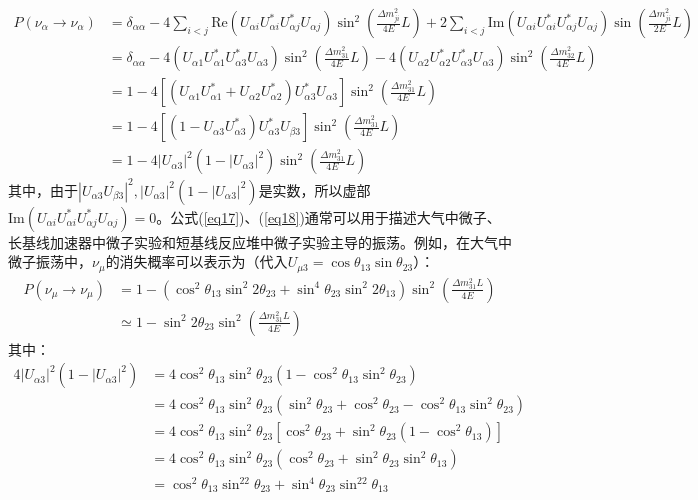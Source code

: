 \documentclass{article}
\begin{document}
		\begin{equation*}
			\begin{aligned}
				P(\nu_\alpha\to\nu_\alpha)&=\delta_{\alpha\alpha}-4\sum_{i<j}\mathrm{Re}(U_{\alpha i}U_{\alpha i}^\ast U_{\alpha j}^\ast U_{\alpha j})\sin^2\left(\frac{\Delta m_{ji}^2}{4E}L\right)+2\sum_{i<j}\mathrm{Im}(U_{\alpha i}U_{\alpha i}^\ast U_{\alpha j}^\ast U_{\alpha j})\sin\left(\frac{\Delta m_{ji}^2}{2E}L\right)\\
				&=\delta_{\alpha\alpha}-4(U_{\alpha 1}U_{\alpha 1}^\ast U_{\alpha 3}^\ast U_{\alpha 3})\sin^2\left(\frac{\Delta m_{31}^2}{4E}L\right)-4(U_{\alpha 2}U_{\alpha 2}^\ast U_{\alpha 3}^\ast U_{\alpha 3})\sin^2\left(\frac{\Delta m_{32}^2}{4E}L\right)\\
				&=1-4[(U_{\alpha1}U_{\alpha1}^\ast+U_{\alpha2}U_{\alpha2}^\ast)U_{\alpha3}^\ast U_{\alpha3}]\sin^2\left(\frac{\Delta m_{31}^2}{4E}L\right)\\
				&=1-4[(1-U_{\alpha3}U_{\alpha3}^\ast)U_{\alpha3}^\ast U_{\beta3}]\sin^2\left(\frac{\Delta m_{31}^2}{4E}L\right)\\
				&=1-4|U_{\alpha3}|^2(1-|U_{\alpha3}|^2)\sin^2\left(\frac{\Delta m_{31}^2}{4E}L\right)
			\end{aligned}
		\end{equation*}
		其中，由于$|U_{\alpha3}U_{\beta3}|^2,|U_{\alpha3}|^2(1-|U_{\alpha3}|^2)$是实数，所以虚部$\mathrm{Im}(U_{\alpha i}U_{\alpha i}^\ast U_{\alpha j}^\ast U_{\alpha j})=0$。公式(\ref{eq17})、(\ref{eq18})通常可以用于描述大气中微子、长基线加速器中微子实验和短基线反应堆中微子实验主导的振荡。例如，在大气中微子振荡中，$\nu_\mu$的消失概率可以表示为（代入$U_{\mu3}=\cos\theta_{13}\sin\theta_{23}$）：
		\begin{align}
			P(\nu_{\mu}\rightarrow\nu_{\mu}) 
				&= 1 - \left( \cos^{2}\theta_{13} \sin^{2}2\theta_{23} + \sin^{4}\theta_{23} \sin^{2}2\theta_{13} \right) 
   					 \sin^{2}\left(\frac{\Delta m_{31}^{2}L}{4E}\right) \label{eq19} \\
				&\simeq 1 - \sin^2 2\theta_{23} \sin^2\left(\frac{\Delta m_{31}^2L}{4E}\right) \label{eq20}
		\end{align}
		其中：
		\begin{equation*}
			\begin{aligned}
				4|U_{\alpha3}|^2(1-|U_{\alpha3}|^2)&=4\cos^2\theta_{13}\sin^2\theta_{23}(1-\cos^2\theta_{13}\sin^2\theta_{23})\\
				&=4\cos^2\theta_{13}\sin^2\theta_{23}(\sin^2\theta_{23}+\cos^2\theta_{23}-\cos^2\theta_{13}\sin^2\theta_{23})\\
				&=4\cos^2\theta_{13}\sin^2\theta_{23}[\cos^2\theta_{23}+\sin^2\theta_{23}(1-\cos^2\theta_{13})]\\
				&=4\cos^2\theta_{13}\sin^2\theta_{23}(\cos^2\theta_{23}+\sin^2\theta_{23}\sin^2\theta_{13})\\
				&=\cos^2\theta_{13}\sin^22\theta_{23}+\sin^4\theta_{23}\sin^22\theta_{13}
			\end{aligned}
		\end{equation*}
\end{document}
